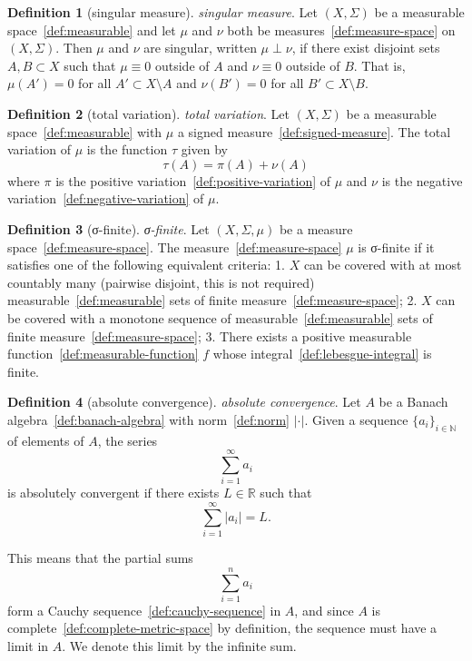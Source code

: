 \documentclass[12pt,a4paper]{article}
\theoremstyle{definition}
\newtheorem{definition}{Definition}
\begin{document}
\begin{definition}[singular measure]\label{def:singular-measure}
\emph{singular measure}. Let $(X,\Sigma)$ be a measurable space~\ref{def:measurable} and let $\mu$ and $\nu$ both be measures~\ref{def:measure-space} on $(X,\Sigma)$. Then $\mu$ and $\nu$ are singular, written $\mu \perp \nu$, if there exist disjoint sets $A,B\subset X$ such that $\mu \equiv 0$ outside of $A$ and $\nu \equiv 0$ outside of $B$. That is, $\mu(A') = 0$ for all $A'\subset X\setminus A$ and $\nu(B') =0$ for all $B'\subset X\setminus B$.
\end{definition}

\begin{definition}[total variation]\label{def:total-variation}
\emph{total variation}. Let $(X,\Sigma)$ be a measurable space~\ref{def:measurable} with $\mu$ a signed measure~\ref{def:signed-measure}. The total variation of $\mu$ is the function $\tau$ given by $$\tau(A) = \pi(A) + \nu(A)$$ where $\pi$ is the positive variation~\ref{def:positive-variation} of $\mu$ and $\nu$ is the negative variation~\ref{def:negative-variation} of $\mu$.
\end{definition}

\begin{definition}[σ-finite]\label{def:σ-finite}
\emph{σ-finite}. Let $(X,\Sigma, \mu)$ be a measure space~\ref{def:measure-space}. The measure~\ref{def:measure-space} $\mu$ is σ-finite if it satisfies one of the following equivalent criteria:
1. $X$ can be covered with at most countably many (pairwise disjoint, this is not required) measurable~\ref{def:measurable} sets of finite measure~\ref{def:measure-space};
2. $X$ can be covered with a monotone sequence of measurable~\ref{def:measurable} sets of finite measure~\ref{def:measure-space};
3. There exists a positive measurable function~\ref{def:measurable-function} $f$ whose integral~\ref{def:lebesgue-integral} is finite.
\end{definition}

\begin{definition}[absolute convergence]\label{def:absolute-convergence}
\emph{absolute convergence}. Let $A$ be a Banach algebra~\ref{def:banach-algebra} with norm~\ref{def:norm} $\vert \cdot \vert$. Given a sequence $\{a_i\}_{i\in \mathbb N}$ of elements of $A$, the series $$\sum_{i=1}^\infty a_i$$ is absolutely convergent if there exists $L \in\mathbb R$ such that  $$\sum_{i=1}^\infty \vert a_i\vert =L.$$

This means that the partial sums $$\sum_{i=1}^n a_i$$ form a Cauchy sequence~\ref{def:cauchy-sequence} in $A$, and since $A$ is complete~\ref{def:complete-metric-space} by definition, the sequence must have a limit in $A$. We denote this limit by the infinite sum.
\end{definition}
\end{document}
